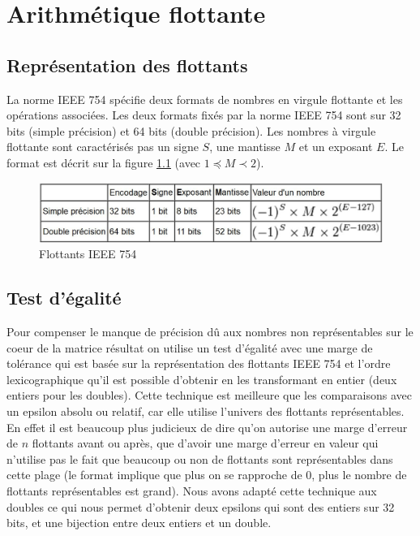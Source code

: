 \documentclass[a4paper, 10pt]{report}
\begin{document}
\chapter{Arithmétique flottante}
\label{sec:arith}

\section{Représentation des flottants}
La norme IEEE 754 spécifie deux formats de nombres en virgule flottante et les opérations associées.
Les deux formats fixés par la norme IEEE 754 sont sur 32 bits (simple précision) et 64 bits (double précision).
Les nombres à virgule flottante sont caractérisés pas un signe $S$, une mantisse $M$ et un exposant $E$.
Le format est décrit sur la figure \ref{fig:IEEE754} (avec $1 \preceq M \prec 2$).
\begin{figure}
\center
\includegraphics[scale=0.5]{IEEE754.jpg}
\caption{Flottants IEEE 754}
\label{fig:IEEE754}
\end{figure}

\section{Test d'égalité}
Pour compenser le manque de précision dû aux nombres non représentables sur le coeur de la matrice résultat on utilise un test d'égalité avec une marge de tolérance
qui est basée sur la représentation des flottants IEEE 754 et l'ordre lexicographique \cite{float} qu'il est possible d'obtenir en les transformant en entier (deux entiers pour les doubles).\newline
Cette technique est meilleure que les comparaisons avec un epsilon absolu ou relatif, car elle utilise l'univers des flottants représentables.\newline
En effet il est beaucoup plus judicieux de dire qu'on autorise une marge d'erreur de $n$ flottants avant ou après, que d'avoir une marge d'erreur en valeur qui n'utilise
pas le fait que beaucoup ou non de flottants sont représentables dans cette plage (le format implique que plus on se rapproche de 0, plus le nombre de flottants représentables est grand).\newline
Nous avons adapté cette technique aux doubles ce qui nous permet d'obtenir deux epsilons qui sont des entiers sur 32 bits, et une bijection entre deux entiers et un double.
\end{document}
